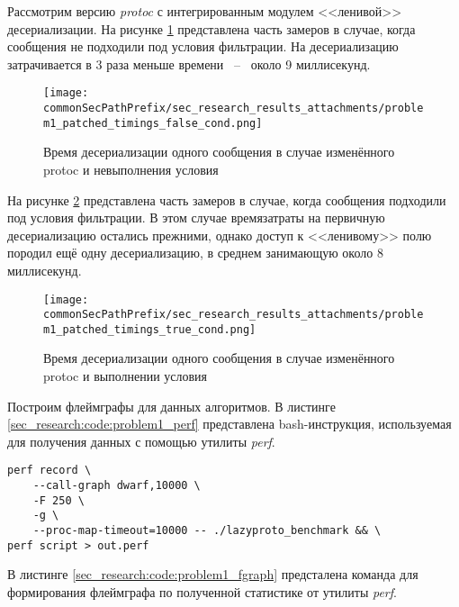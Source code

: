 Рассмотрим версию \textit{protoc} с интегрированным модулем <<ленивой>> десериализации.
На рисунке \ref{fig:problem1_patched_timings_false_cond} представлена часть замеров в случае, когда сообщения не подходили под условия фильтрации. На десериализацию затрачивается в 3 раза меньше времени ~--~ около 9 миллисекунд.

\begin{figure}[!ht]
    \centering
    \texttt{[image: \\commonSecPathPrefix/sec\_research\_results\_attachments/problem1\_patched\_timings\_false\_cond.png]}
    \caption{Время десериализации одного сообщения в случае изменённого protoc и невыполнения условия}
    \label{fig:problem1_patched_timings_false_cond}
\end{figure}

На рисунке \ref{fig:problem1_patched_timings_true_cond} представлена часть замеров в случае, когда сообщения подходили под условия фильтрации. В этом случае времязатраты на первичную десериализацию остались прежними, однако доступ к <<ленивому>> полю породил ещё одну десериализацию, в среднем занимающую около 8 миллисекунд. 

\begin{figure}[!ht]
    \centering
    \texttt{[image: \\commonSecPathPrefix/sec\_research\_results\_attachments/problem1\_patched\_timings\_true\_cond.png]}
    \caption{Время десериализации одного сообщения в случае изменённого protoc и выполнении условия}
    \label{fig:problem1_patched_timings_true_cond}
\end{figure}

Построим флеймграфы для данных алгоритмов. В листинге \ref{sec_research:code:problem1_perf} представлена bash-инструкция, используемая для получения данных с помощью утилиты \textit{perf}.

\noindent\begin{minipage}{\linewidth}
\begin{lstlisting}[style=CodeListing, caption={bash-инструкция для сбора статистики утилитой perf}, label=sec_research:code:problem1_perf]
perf record \
    --call-graph dwarf,10000 \
    -F 250 \
    -g \
    --proc-map-timeout=10000 -- ./lazyproto_benchmark && \
perf script > out.perf
\end{lstlisting}
\end{minipage}

В листинге \ref{sec_research:code:problem1_fgraph} предсталена команда для формирования флеймграфа по полученной статистике от утилиты \textit{perf}.

